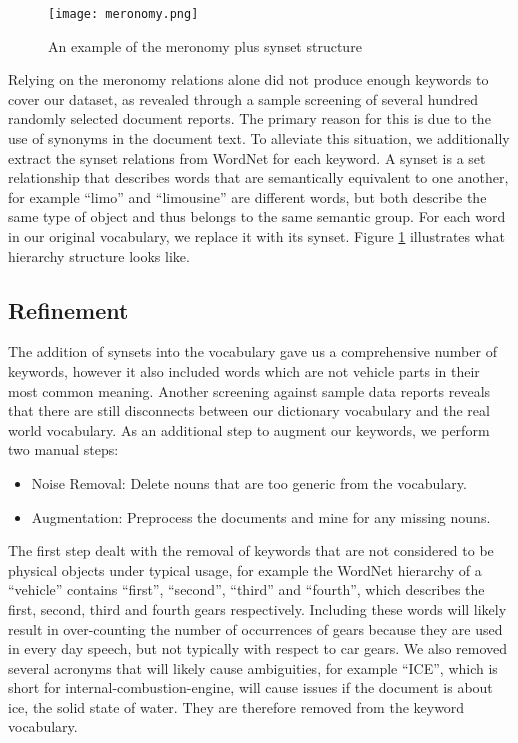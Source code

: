 	\begin{figure}
	   \centering  
	   \texttt{[image: meronomy.png]}
	   \caption{An example of the meronomy plus synset structure}
	   \label{figure:meronomy}
	\end{figure}


Relying on the meronomy relations alone did not produce enough keywords to cover 
our dataset, as revealed through a sample screening of several hundred randomly 
selected document reports. The primary reason for this is due to the use of synonyms
in the document text. To alleviate this situation, we additionally extract
the synset relations from WordNet for each keyword. A synset is a set
relationship that describes words that are semantically equivalent to one
another, for example ``limo'' and ``limousine'' are different words, but both
describe the same type of object and thus belongs to the same semantic group.
For each word in our original vocabulary, we replace it with its synset. Figure
\ref{figure:meronomy} illustrates what hierarchy structure looks like.




\subsection{Refinement}
The addition of synsets into the vocabulary gave us a comprehensive number of
keywords, however it also included words which are not vehicle parts in their most
common meaning. Another screening against sample data reports reveals that there are 
still disconnects between our dictionary vocabulary and the real world vocabulary.
As an additional step to augment our keywords, we perform two manual steps:

\begin{itemize} [noitemsep]
  \item Noise Removal: Delete nouns that are too generic from the vocabulary.
  \item Augmentation: Preprocess the documents and mine for any missing nouns.
\end{itemize}
The first step dealt with the removal of keywords that are not considered to be
physical objects under typical usage, for example the WordNet hierarchy of a
``vehicle'' contains ``first'', ``second'', ``third'' and ``fourth'', which
describes the first, second, third and fourth gears respectively. Including
these words will likely result in over-counting the number of occurrences of
gears because they are used in every day speech, but not typically with respect
to car gears. We also removed several acronyms that will likely cause
ambiguities, for example ``ICE'', which is short for internal-combustion-engine,
will cause issues if the document is about ice, the solid state of water. They
are therefore removed from the keyword vocabulary.

